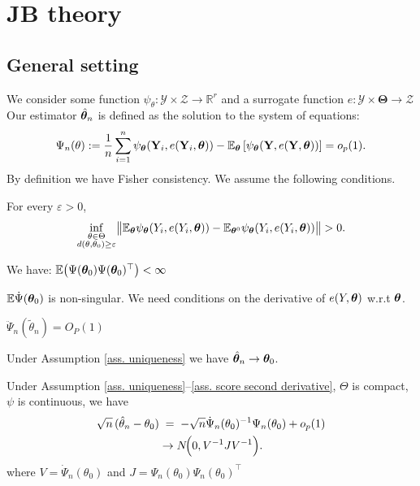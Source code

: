 \documentclass[twoside,11pt]{article}
\newcommand{\jb}[2][]{\todo[color=jbcolor, caption={JB}, #1]{#2}}
\begin{document}
\section{JB theory}

\newcommand{\R}{\mathbb{R}}

\subsection{General setting}

We consider some function $\psi_\theta:\mathcal{Y}\times \mathcal{Z} \to \mathbb{R}^r$ and a surrogate function $e : \mathcal{Y} \times \bm{\Theta} \to \mathcal{Z}$
Our estimator $\hat{{\bm{\theta}}}_n$ is defined as the solution to the system of equations:
\begin{equation}
\Psi_n(\theta) := \frac{1}{n} \sum_{i=1}^n \psi_{\bm{\theta}}({\bf Y}_i, e({\bf Y}_i, {\bm{\theta}})) 
-
\mathbb{E}_{\bm{\theta}}
\left[ 
\psi_{\bm{\theta}}({\bf Y}, e({\bf Y}, {\bm{\theta}})) 
\right] = o_p(1).
\end{equation}
By definition we have Fisher consistency.
We assume the following conditions.

\begin{assumptionA}\label{ass. uniqueness}
For every $\varepsilon>0$,
$$
\inf_{\substack{\theta\in\Theta\\d(\theta,\theta_0)\ge\varepsilon}}
\bigl\| \mathbb{E}_{\bm{\theta}} \psi_{\bm{\theta}}(Y_i, e(Y_i,{\bm{\theta}}) ) - \mathbb{E}_{{\bm{\theta}}^0} \psi_{\bm{\theta}}(Y_i, e(Y_i,{\bm{\theta}}) ) \bigr\|
>0.
$$
\end{assumptionA}

\begin{assumptionA}\label{ass. bounded squared score}
We have:
$\mathbb{E} \bigl(\Psi({\bm{\theta}}_0) \Psi({\bm{\theta}}_0)^\top \bigr)<\infty$
\jb{Seems fine.}
\end{assumptionA}

\begin{assumptionA}\label{ass. score derivative}
$\mathbb{E}\dot\Psi({\bm{\theta}}_0)$ is non-singular. We need conditions on the derivative of $e(Y,{\bm{\theta}})$ w.r.t ${\bm{\theta}}$.
\end{assumptionA}

\begin{assumptionA}\label{ass. score second derivative}
$\ddot\Psi_n(\tilde\theta_n)=O_P(1)$
\end{assumptionA}


\begin{theorem}
Under Assumption \ref{ass. uniqueness} we have $ \hat{{\bm{\theta}}}_n \to {\bm{\theta}}_0$.
\end{theorem}

\begin{theorem}
Under Assumption \ref{ass. uniqueness}--\ref{ass. score second derivative}, $\Theta$ is compact, %
$\psi$ is continuous, we have
\begin{align*}
  \sqrt{n}\,(\hat\theta_n - \theta_0)
  &\;=\;
  - \sqrt{n} \dot\Psi_n(\theta_0)^{-1} \Psi_n(\theta_0) +o_p(1) \\
  &\rightarrow N\!\Bigl(0, V^{-1} J V^{-1} \Bigr).
\end{align*}
where $V =\dot\Psi_n(\theta_0) $ and $J= \Psi_n(\theta_0) \Psi_n(\theta_0)^\top$
\end{theorem}
\end{document}
